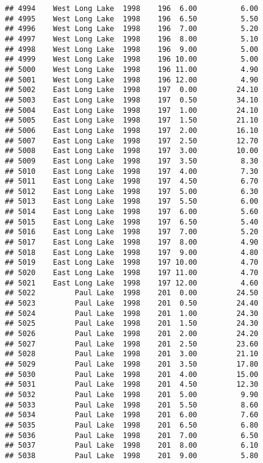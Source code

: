 \documentclass[
]{article}
\begin{document}
\begin{verbatim}
## 4994    West Long Lake  1998    196  6.00          6.00
## 4995    West Long Lake  1998    196  6.50          5.50
## 4996    West Long Lake  1998    196  7.00          5.20
## 4997    West Long Lake  1998    196  8.00          5.10
## 4998    West Long Lake  1998    196  9.00          5.00
## 4999    West Long Lake  1998    196 10.00          5.00
## 5000    West Long Lake  1998    196 11.00          4.90
## 5001    West Long Lake  1998    196 12.00          4.90
## 5002    East Long Lake  1998    197  0.00         24.10
## 5003    East Long Lake  1998    197  0.50         34.10
## 5004    East Long Lake  1998    197  1.00         24.10
## 5005    East Long Lake  1998    197  1.50         21.10
## 5006    East Long Lake  1998    197  2.00         16.10
## 5007    East Long Lake  1998    197  2.50         12.70
## 5008    East Long Lake  1998    197  3.00         10.00
## 5009    East Long Lake  1998    197  3.50          8.30
## 5010    East Long Lake  1998    197  4.00          7.30
## 5011    East Long Lake  1998    197  4.50          6.70
## 5012    East Long Lake  1998    197  5.00          6.30
## 5013    East Long Lake  1998    197  5.50          6.00
## 5014    East Long Lake  1998    197  6.00          5.60
## 5015    East Long Lake  1998    197  6.50          5.40
## 5016    East Long Lake  1998    197  7.00          5.20
## 5017    East Long Lake  1998    197  8.00          4.90
## 5018    East Long Lake  1998    197  9.00          4.80
## 5019    East Long Lake  1998    197 10.00          4.70
## 5020    East Long Lake  1998    197 11.00          4.70
## 5021    East Long Lake  1998    197 12.00          4.60
## 5022         Paul Lake  1998    201  0.00         24.50
## 5023         Paul Lake  1998    201  0.50         24.40
## 5024         Paul Lake  1998    201  1.00         24.30
## 5025         Paul Lake  1998    201  1.50         24.30
## 5026         Paul Lake  1998    201  2.00         24.20
## 5027         Paul Lake  1998    201  2.50         23.60
## 5028         Paul Lake  1998    201  3.00         21.10
## 5029         Paul Lake  1998    201  3.50         17.80
## 5030         Paul Lake  1998    201  4.00         15.00
## 5031         Paul Lake  1998    201  4.50         12.30
## 5032         Paul Lake  1998    201  5.00          9.90
## 5033         Paul Lake  1998    201  5.50          8.60
## 5034         Paul Lake  1998    201  6.00          7.60
## 5035         Paul Lake  1998    201  6.50          6.80
## 5036         Paul Lake  1998    201  7.00          6.50
## 5037         Paul Lake  1998    201  8.00          6.10
## 5038         Paul Lake  1998    201  9.00          5.80

\end{verbatim}
\end{document}

